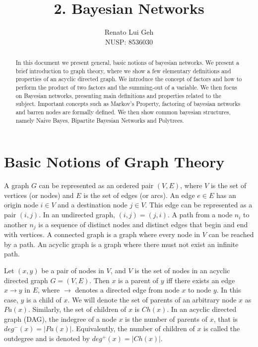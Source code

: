 \documentclass{amsart}
\title[]{2. Bayesian Networks}
\author[]{Renato Lui Geh\\NUSP\@: 8536030}
\theoremstyle{plain}
\begin{document}
\begin{abstract}
  In this document we present general, basic notions of bayesian networks. We present a brief
  introduction to graph theory, where we show a few elementary definitions and properties of an
  acyclic directed graph. We introduce the concept of factors and how to perform the product of two
  factors and the summing-out of a variable. We then focus on Bayesian networks, presenting main
  definitions and properties related to the subject. Important concepts such as Markov's Property,
  factoring of bayesian networks and barren nodes are formally defined. We then show common
  bayesian structures, namely Naive Bayes, Bipartite Bayesian Networks and Polytrees.
  \vspace*{-2.5em}
\end{abstract}

\maketitle

\section{Basic Notions of Graph Theory}

A graph $G$ can be represented as an ordered pair $(V,E)$, where $V$ is the set of vertices (or
nodes) and $E$ is the set of edges (or arcs). An edge $e\in E$ has an origin node $i\in V$ and a
destination node $j\in V$. This edge can be represented as a pair $(i,j)$. In an undirected graph,
$(i,j)=(j,i)$. A path from a node $n_i$ to another $n_j$ is a sequence of distinct nodes and
distinct edges that begin and end with vertices. A connected graph is a graph where every node in
$V$ can be reached by a path. An acyclic graph is a graph where there must not exist an infinite
path.

Let $(x,y)$ be a pair of nodes in $V$, and $V$ is the set of nodes in an acyclic directed graph
$G=(V,E)$. Then $x$ is a parent of $y$ iff there exists an edge $x\to y$ in $E$, where $\to$
denotes a directed edge from node $x$ to node $y$. In this case, $y$ is a child of $x$. We will
denote the set of parents of an arbitrary node $x$ as $Pa(x)$. Similarly, the set of children of
$x$ is $Ch(x)$. In an acyclic directed graph (DAG), the indegree of a node $x$ is the number of
parents of $x$, that is $deg^-(x)=|Pa(x)|$. Equivalently, the number of children of $x$ is called
the outdegree and is denoted by $deg^+(x)=|Ch(x)|$.
\end{document}
